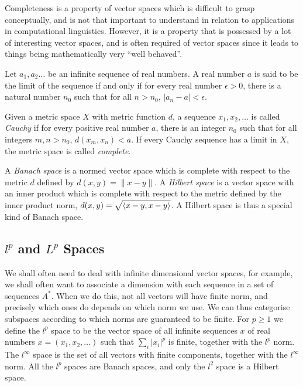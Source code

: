 \documentclass[12pt]{report}
\begin{document}
Completeness is a property of vector spaces which is difficult to grasp conceptually, and is not that important to understand in relation to applications in computational linguistics. However, it is a property that is possessed by a lot of interesting vector spaces, and is often required of vector spaces since it leads to things being mathematically very ``well behaved''.

\begin{defn}[Limit]
Let $a_1,a_2\ldots$ be an infinite sequence of real numbers. A real number $a$ is said to be the limit of the sequence if and only if for every real number $\epsilon > 0$, there is a natural number $n_0$ such that for all $n > n_0$, $|a_n - a| < \epsilon$.
\end{defn}

\begin{defn}[Completeness]
Given a metric space $X$ with metric function $d$, a sequence $x_1, x_2, \ldots$ is called \emph{Cauchy} if for every positive real number $a$, there is an integer $n_0$ such that for all integers $m,n > n_0$, $d(x_m,x_n) < a$. If every Cauchy sequence has a limit in $X$, the metric space is called \emph{complete}.

A \emph{Banach space} is a normed vector space which is complete with respect to the metric $d$ defined by $d(x,y) = \|x - y\|$. A \emph{Hilbert space} is a vector space with an inner product which is complete with respect to the metric defined by the inner product norm, $d(x,y) = \sqrt{\langle x-y, x-y \rangle}$. A Hilbert space is thus a special kind of Banach space.
\end{defn}

\subsection{$l^p$ and $L^p$ Spaces}

We shall often need to deal with infinite dimensional vector spaces, for example, we shall often want to associate a dimension with each sequence in a set of sequences $A^*$. When we do this, not all vectors will have finite norm, and precisely which ones do depends on which norm we use. We can thus categorise subspaces according to which norms are guaranteed to be finite. For $p \ge 1$ we define the $l^p$ space to be the vector space of all infinite sequences $x$ of real numbers $x = (x_1,x_2,\ldots)$ such that $\sum_i |x_i|^p$ is finite, together with the $l^p$ norm. The $l^\infty$ space is the set of all vectors with finite components, together with the $l^\infty$ norm.
All the $l^p$ spaces are Banach spaces, and only the $l^2$ space is a Hilbert space.
\end{document}
